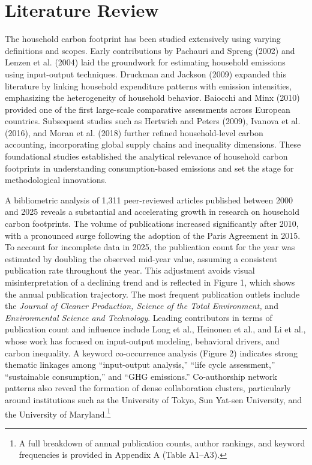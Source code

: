 \documentclass[12pt,a4paper]{article}%
\begin{document}
\section{Literature Review}
The household carbon footprint has been studied extensively using varying definitions and scopes. Early contributions by Pachauri and Spreng (2002) and Lenzen et al. (2004) laid the groundwork for estimating household emissions using input-output techniques. Druckman and Jackson (2009) expanded this literature by linking household expenditure patterns with emission intensities, emphasizing the heterogeneity of household behavior. Baiocchi and Minx (2010) provided one of the first large-scale comparative assessments across European countries. Subsequent studies such as Hertwich and Peters (2009), Ivanova et al. (2016), and Moran et al. (2018) further refined household-level carbon accounting, incorporating global supply chains and inequality dimensions. These foundational studies established the analytical relevance of household carbon footprints in understanding consumption-based emissions and set the stage for methodological innovations.

A bibliometric analysis of 1,311 peer-reviewed articles published between 2000 and 2025 reveals a substantial and accelerating growth in research on household carbon footprints. The volume of publications increased significantly after 2010, with a pronounced surge following the adoption of the Paris Agreement in 2015. To account for incomplete data in 2025, the publication count for the year was estimated by doubling the observed mid-year value, assuming a consistent publication rate throughout the year. This adjustment avoids visual misinterpretation of a declining trend and is reflected in Figure 1, which shows the annual publication trajectory. The most frequent publication outlets include the \textit{Journal of Cleaner Production, Science of the Total Environment,} and \textit{Environmental Science and Technology}. Leading contributors in terms of publication count and influence include Long et al., Heinonen et al., and Li et al., whose work has focused on input-output modeling, behavioral drivers, and carbon inequality. A keyword co-occurrence analysis (Figure 2) indicates strong thematic linkages among “input-output analysis,” “life cycle assessment,” “sustainable consumption,” and “GHG emissions.” Co-authorship network patterns also reveal the formation of dense collaboration clusters, particularly around institutions such as the University of Tokyo, Sun Yat-sen University, and the University of Maryland.\footnote{A full breakdown of annual publication counts, author rankings, and keyword frequencies is provided in Appendix A (Table A1–A3).}
\end{document}
